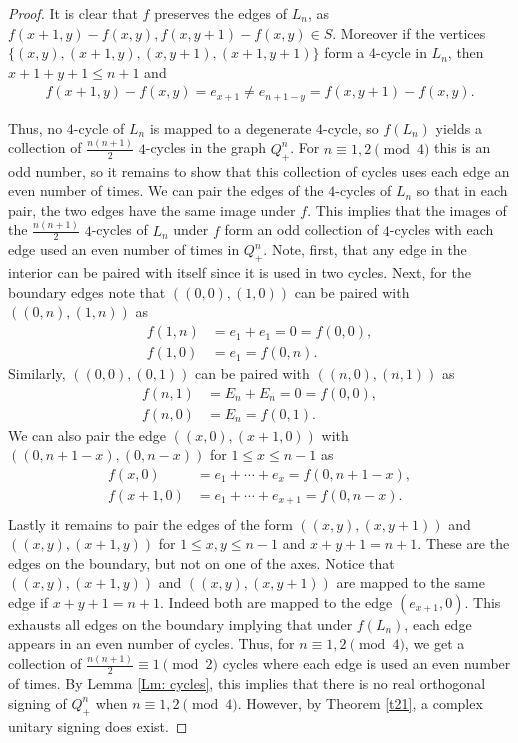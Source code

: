 \begin{proof}
It is clear that $f$ preserves the edges of $L_n$, as $f(x+1, y) - f(x, y),  f(x, y+1) - f(x, y)\in S$. Moreover if the vertices $\{(x, y), (x+1, y), (x, y+1), (x+1, y+1) \}$ form a $4$-cycle in $L_n$, then $x+1+y+1 \leq n+1$ and 
\begin{align*}
    f(x+1, y) - f(x, y) = e_{x+1} \neq e_{n+1-y} = f(x, y+1) - f(x, y).
\end{align*}

Thus, no $4$-cycle of $L_n$ is mapped to a degenerate $4$-cycle, so $f(L_n)$ yields a collection of $\frac{n(n+1)}{2}$ $4$-cycles in the graph $Q_+^n$.
For $n \equiv 1, 2 \pmod{4}$ this is an odd number, 
so it remains to show that this collection of cycles uses each 
edge an even number of times. We can pair the edges 
of the $4$-cycles of $L_n$ so that in each pair, the two edges 
have the same image under $f$. This implies that the images of 
the $\frac{n(n+1)}{2}$ $4$-cycles of $L_n$ under $f$ form an odd 
collection of $4$-cycles with each edge used an even number of times
in $Q_+^n$. Note, first, that any edge in the interior can be paired 
with itself since it is used in two cycles. Next, for the boundary 
edges note that $((0,0), (1,0))$ can be paired 
with $((0, n), (1, n))$ as 
\begin{align*}
    f(1, n) &= e_1 + e_1 = 0 = f(0,0), \\
    f(1,0) &= e_1 = f(0,n).
\end{align*}
Similarly, $((0,0), (0, 1))$ can be paired with $((n, 0), (n, 1))$ as 
\begin{align*}
    f(n,1) &= E_n + E_n = 0 = f(0, 0), \\
    f(n, 0) &=  E_n  = f(0, 1).
\end{align*}
We can also pair the edge $((x, 0), (x+1, 0))$ 
with $((0, n+1-x), (0, n-x))$ for $1 \leq x \leq n-1$ as 
\begin{align*}
    f(x,0) &= e_1 + \cdots + e_x = f(0, n+1-x), \\
    f(x+1, 0) &= e_1 + \cdots + e_{x+1} = f(0, n-x). \\
\end{align*}
Lastly it remains to pair the edges of the form $((x, y), (x, y+1))$ 
and $((x, y), (x+1, y))$ for $1 \leq x,y \leq n-1$ and 
$x+y+1 = n+1$. These are the edges on the boundary, but not on
one of the axes. Notice that $((x, y), (x+1, y))$ and 
$((x, y), (x, y+1))$ are mapped to the same edge if $x+y+1 = n+1$. 
Indeed both are mapped to the edge $(e_{x+1}, 0)$. 
This exhausts all edges on the boundary implying that under 
$f(L_n)$, each edge appears in an even number of cycles. 
Thus, for $n \equiv 1, 2 \pmod{4}$, we get a collection 
of $\frac{n(n+1)}{2} \equiv 1 \pmod{2}$ cycles where each edge 
is used an even number of times. 
By Lemma \ref{Lm: cycles}, this implies that there 
is no real orthogonal signing of $Q_+^n$ 
when $n \equiv 1,2 \pmod{4}$. However, by  
Theorem \ref{t21}, a complex unitary signing does exist. 
\end{proof}
